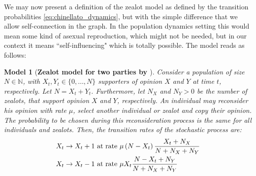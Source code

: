 \documentclass[12pt,a4paper,twoside]{article}
\newtheorem{model}{Model}[section]
\begin{document}
We may now present a definition of the zealot model as defined by the transition probabilities \eqref{eq:chinellato_dynamics}, but with the simple difference that we allow self-connection in the graph. In the population dynamics setting this would mean some kind of asexual reproduction, which might not be needed, but in our context it means ``self-influencing" which is totally possible. The model reads as follows:
\begin{model}[\textbf{Zealot model for two parties by \cite{Aguiar2011, Chinellato2015, Braha2017}}]\label{model:zealot}
Consider a population of size $N \in \mathbb{N}$, with $X_t, Y_t \in \lbrace 0,\dots,N\rbrace$ supporters of opinion $X$ and $Y$ at time $t$, respectively. Let $N = X_t + Y_t$. Furthermore, let $N_X$ and $N_Y > 0$ be the number of zealots, that support opinion $X$ and $Y$, respectively. An individual may reconsider his opinion with rate $\mu$, select another individual or zealot and copy their opinion. The probability to be chosen during this reconsideration process is the same for all individuals and zealots. Then, the transition rates of the stochastic process are:
\begin{align}\label{def:transition_rates_zealot}
	\begin{split}
	X_t \rightarrow X_t + 1 & \textnormal{ at rate } \mu\left(N-X_t\right)\frac{X_t + N_X}{N + N_X + N_Y} \\
	X_t \rightarrow X_t - 1 & \textnormal{ at rate } \mu X_t\frac{N-X_t+N_Y}{N+N_X+N_Y}
	\end{split}
\end{align}
\end{model}
\end{document}
